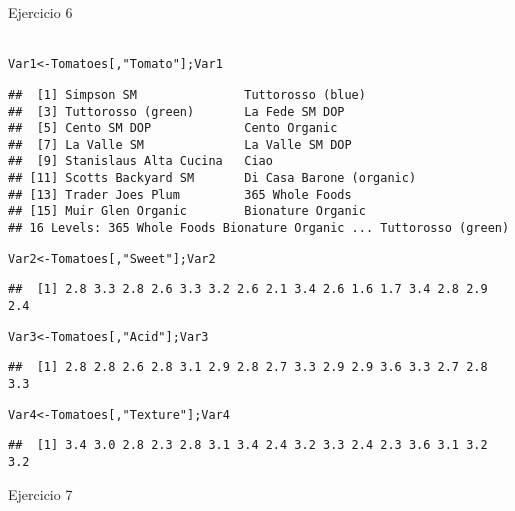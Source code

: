 \documentclass{article}\usepackage[]{graphicx}\usepackage[]{color}
\makeatletter
\newcommand{\hlstr}[1]{\textcolor[rgb]{0.192,0.494,0.8}{#1}}%
\newcommand{\hlstd}[1]{\textcolor[rgb]{0.345,0.345,0.345}{#1}}%
\newcommand{\hlkwb}[1]{\textcolor[rgb]{0.69,0.353,0.396}{#1}}%
\newenvironment{kframe}{%
 \def\at@end@of@kframe{}%
 \ifinner\ifhmode%
  \def\at@end@of@kframe{\end{minipage}}%
  \begin{minipage}{\columnwidth}%
 \fi\fi%
 \def\FrameCommand##1{\hskip\@totalleftmargin \hskip-\fboxsep
 \colorbox{shadecolor}{##1}\hskip-\fboxsep
     \hskip-\linewidth \hskip-\@totalleftmargin \hskip\columnwidth}%
 \MakeFramed {\advance\hsize-\width
   \@totalleftmargin\z@ \linewidth\hsize
   \@setminipage}}%
 {\par\unskip\endMakeFramed%
 \at@end@of@kframe}
\newenvironment{knitrout}{}{} %
\makeatother
\begin{document}
Ejercicio 6\\
\\
\begin{knitrout}
\color{fgcolor}\begin{kframe}
\begin{alltt}
\hlstd{Var1}\hlkwb{<-}\hlstd{Tomatoes[,}\hlstr{"Tomato"}\hlstd{]; Var1}
\end{alltt}
\begin{verbatim}
##  [1] Simpson SM               Tuttorosso (blue)       
##  [3] Tuttorosso (green)       La Fede SM DOP          
##  [5] Cento SM DOP             Cento Organic           
##  [7] La Valle SM              La Valle SM DOP         
##  [9] Stanislaus Alta Cucina   Ciao                    
## [11] Scotts Backyard SM       Di Casa Barone (organic)
## [13] Trader Joes Plum         365 Whole Foods         
## [15] Muir Glen Organic        Bionature Organic       
## 16 Levels: 365 Whole Foods Bionature Organic ... Tuttorosso (green)
\end{verbatim}
\begin{alltt}
\hlstd{Var2}\hlkwb{<-}\hlstd{Tomatoes[,}\hlstr{"Sweet"}\hlstd{]; Var2}
\end{alltt}
\begin{verbatim}
##  [1] 2.8 3.3 2.8 2.6 3.3 3.2 2.6 2.1 3.4 2.6 1.6 1.7 3.4 2.8 2.9 2.4
\end{verbatim}
\begin{alltt}
\hlstd{Var3}\hlkwb{<-}\hlstd{Tomatoes[,}\hlstr{"Acid"}\hlstd{]; Var3}
\end{alltt}
\begin{verbatim}
##  [1] 2.8 2.8 2.6 2.8 3.1 2.9 2.8 2.7 3.3 2.9 2.9 3.6 3.3 2.7 2.8 3.3
\end{verbatim}
\begin{alltt}
\hlstd{Var4}\hlkwb{<-}\hlstd{Tomatoes[,}\hlstr{"Texture"}\hlstd{]; Var4}
\end{alltt}
\begin{verbatim}
##  [1] 3.4 3.0 2.8 2.3 2.8 3.1 3.4 2.4 3.2 3.3 2.4 2.3 3.6 3.1 3.2 3.2
\end{verbatim}
\end{kframe}
\end{knitrout}
Ejercicio 7\\
\\
\end{document}
